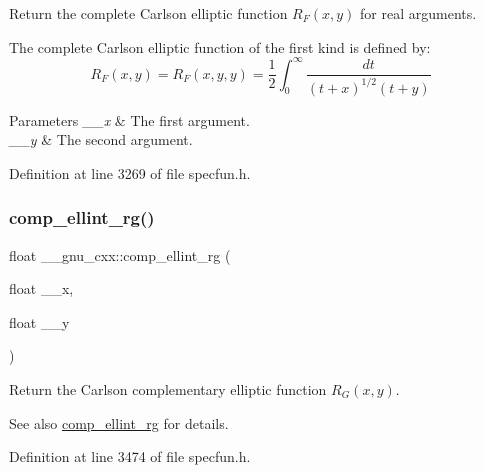Return the complete Carlson elliptic function $ R_F(x,y) $ for real arguments.

The complete Carlson elliptic function of the first kind is defined by\+: \[ R_F(x,y) = R_F(x,y,y) = \frac{1}{2} \int_0^\infty \frac{dt}{(t + x)^{1/2}(t + y)} \]


\begin{DoxyParams}{Parameters}
{\em \+\_\+\+\_\+x} & The first argument. \\
\hline
{\em \+\_\+\+\_\+y} & The second argument. \\
\hline
\end{DoxyParams}


Definition at line 3269 of file specfun.\+h.

\mbox{\label{group__gnu__math__spec__func_ga978f8eec6e5edc918b243925dbacb65b}} 
\subsubsection{\texorpdfstring{comp\+\_\+ellint\+\_\+rg()}{comp\_ellint\_rg()}\hspace{0.1cm}{\footnotesize\ttfamily [1/3]}}
{\footnotesize\ttfamily float \+\_\+\+\_\+gnu\+\_\+cxx\+::comp\+\_\+ellint\+\_\+rg (\begin{DoxyParamCaption}\item[{float}]{\+\_\+\+\_\+x,  }\item[{float}]{\+\_\+\+\_\+y }\end{DoxyParamCaption})\hspace{0.3cm}{\ttfamily [inline]}}

Return the Carlson complementary elliptic function $ R_G(x,y) $.

\begin{DoxySeeAlso}{See also}
\hyperlink{group__gnu__math__spec__func_ga978f8eec6e5edc918b243925dbacb65b}{comp\+\_\+ellint\+\_\+rg} for details. 
\end{DoxySeeAlso}


Definition at line 3474 of file specfun.\+h.

\mbox{\label{group__gnu__math__spec__func_gaca5fa8ee8125afc8f35ec6b27806e873}} 

